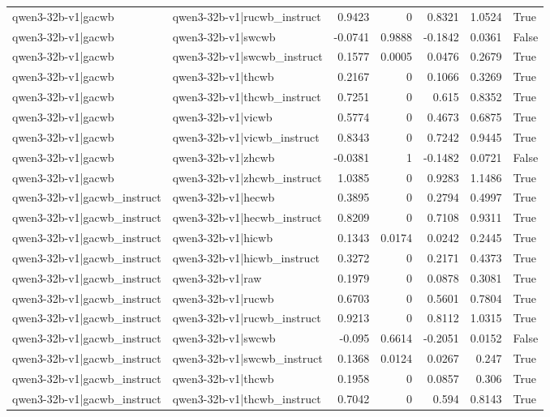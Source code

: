 \begin{table}
\begin{tabular}{l l r r r r l}
qwen3-32b-v1|gacwb & qwen3-32b-v1|rucwb_instruct & 0.9423 & 0 & 0.8321 & 1.0524 & True \\
qwen3-32b-v1|gacwb & qwen3-32b-v1|swcwb & -0.0741 & 0.9888 & -0.1842 & 0.0361 & False \\
qwen3-32b-v1|gacwb & qwen3-32b-v1|swcwb_instruct & 0.1577 & 0.0005 & 0.0476 & 0.2679 & True \\
qwen3-32b-v1|gacwb & qwen3-32b-v1|thcwb & 0.2167 & 0 & 0.1066 & 0.3269 & True \\
qwen3-32b-v1|gacwb & qwen3-32b-v1|thcwb_instruct & 0.7251 & 0 & 0.615 & 0.8352 & True \\
qwen3-32b-v1|gacwb & qwen3-32b-v1|vicwb & 0.5774 & 0 & 0.4673 & 0.6875 & True \\
qwen3-32b-v1|gacwb & qwen3-32b-v1|vicwb_instruct & 0.8343 & 0 & 0.7242 & 0.9445 & True \\
qwen3-32b-v1|gacwb & qwen3-32b-v1|zhcwb & -0.0381 & 1 & -0.1482 & 0.0721 & False \\
qwen3-32b-v1|gacwb & qwen3-32b-v1|zhcwb_instruct & 1.0385 & 0 & 0.9283 & 1.1486 & True \\
qwen3-32b-v1|gacwb_instruct & qwen3-32b-v1|hecwb & 0.3895 & 0 & 0.2794 & 0.4997 & True \\
qwen3-32b-v1|gacwb_instruct & qwen3-32b-v1|hecwb_instruct & 0.8209 & 0 & 0.7108 & 0.9311 & True \\
qwen3-32b-v1|gacwb_instruct & qwen3-32b-v1|hicwb & 0.1343 & 0.0174 & 0.0242 & 0.2445 & True \\
qwen3-32b-v1|gacwb_instruct & qwen3-32b-v1|hicwb_instruct & 0.3272 & 0 & 0.2171 & 0.4373 & True \\
qwen3-32b-v1|gacwb_instruct & qwen3-32b-v1|raw & 0.1979 & 0 & 0.0878 & 0.3081 & True \\
qwen3-32b-v1|gacwb_instruct & qwen3-32b-v1|rucwb & 0.6703 & 0 & 0.5601 & 0.7804 & True \\
qwen3-32b-v1|gacwb_instruct & qwen3-32b-v1|rucwb_instruct & 0.9213 & 0 & 0.8112 & 1.0315 & True \\
qwen3-32b-v1|gacwb_instruct & qwen3-32b-v1|swcwb & -0.095 & 0.6614 & -0.2051 & 0.0152 & False \\
qwen3-32b-v1|gacwb_instruct & qwen3-32b-v1|swcwb_instruct & 0.1368 & 0.0124 & 0.0267 & 0.247 & True \\
qwen3-32b-v1|gacwb_instruct & qwen3-32b-v1|thcwb & 0.1958 & 0 & 0.0857 & 0.306 & True \\
qwen3-32b-v1|gacwb_instruct & qwen3-32b-v1|thcwb_instruct & 0.7042 & 0 & 0.594 & 0.8143 & True \\

\end{tabular}
\end{table}
